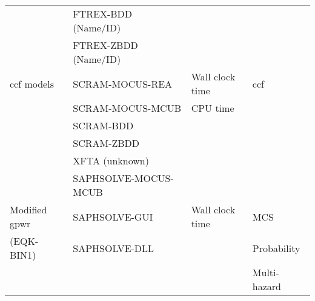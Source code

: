 \begin{longtable}{llll}
                & FTREX-BDD (Name/ID) &  &  \\
                & FTREX-ZBDD (Name/ID) &  & \\
\midrule
\acrshort{ccf} models  & SCRAM-MOCUS-REA & Wall clock time & \acrshort{ccf} \\
            & SCRAM-MOCUS-MCUB & CPU time & \\
            & SCRAM-BDD & & \\
            & SCRAM-ZBDD & & \\
            & XFTA (unknown) & &  \\
            & SAPHSOLVE-MOCUS-MCUB &  &  \\
\midrule
Modified \acrshort{gpwr} & SAPHSOLVE-GUI & Wall clock time & MCS \\ 
(EQK-BIN1) \cite{batikh_time-dependent_2023} & SAPHSOLVE-DLL & & Probability \\
& & & Multi-hazard \\
\bottomrule
\end{longtable}
